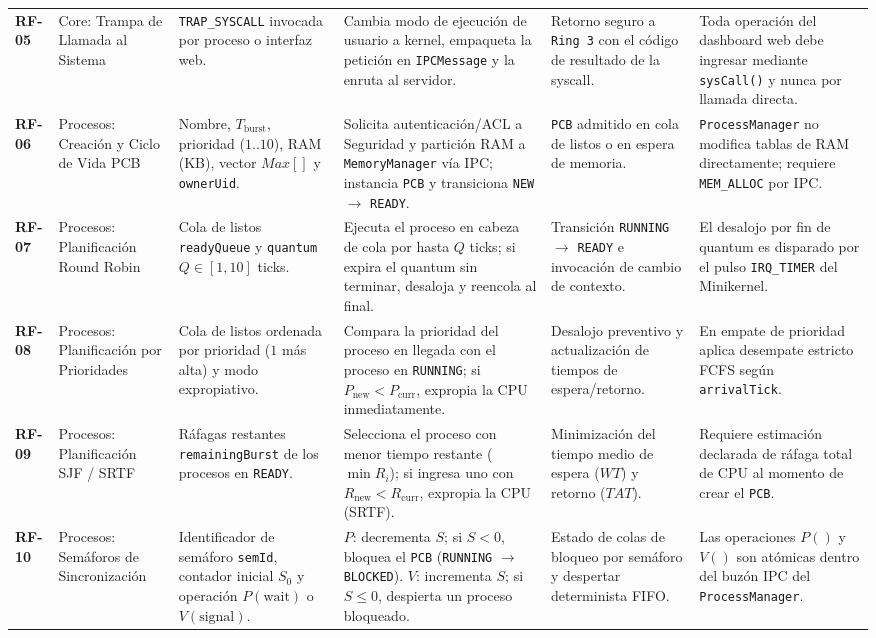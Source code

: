 \documentclass[10pt,twocolumn,letterpaper]{article}
\begin{document}
\begin{table}[!t]
\begin{tabularx}{\textwidth}{C{0.9cm} L{2.2cm} L{2.8cm} Y L{2.8cm} L{3.3cm}}
\textbf{RF-05} & Core: Trampa de Llamada al Sistema & \texttt{TRAP\_SYSCALL} invocada por proceso o interfaz web. & Cambia modo de ejecuci\'on de usuario a kernel, empaqueta la petici\'on en \texttt{IPCMessage} y la enruta al servidor. & Retorno seguro a \texttt{Ring 3} con el c\'odigo de resultado de la syscall. & Toda operaci\'on del dashboard web debe ingresar mediante \texttt{sysCall()} y nunca por llamada directa. \\
\textbf{RF-06} & Procesos: Creaci\'on y Ciclo de Vida PCB & Nombre, $T_{\text{burst}}$, prioridad ($1..10$), RAM (KB), vector $Max[]$ y \texttt{ownerUid}. & Solicita autenticaci\'on/ACL a Seguridad y partici\'on RAM a \texttt{MemoryManager} v\'ia IPC; instancia \texttt{PCB} y transiciona \texttt{NEW} $\rightarrow$ \texttt{READY}. & \texttt{PCB} admitido en cola de listos o en espera de memoria. & \texttt{ProcessManager} no modifica tablas de RAM directamente; requiere \texttt{MEM\_ALLOC} por IPC. \\
\textbf{RF-07} & Procesos: Planificaci\'on Round Robin & Cola de listos \texttt{readyQueue} y \texttt{quantum} $Q \in [1,10]$ ticks. & Ejecuta el proceso en cabeza de cola por hasta $Q$ ticks; si expira el quantum sin terminar, desaloja y reencola al final. & Transici\'on \texttt{RUNNING} $\rightarrow$ \texttt{READY} e invocaci\'on de cambio de contexto. & El desalojo por fin de quantum es disparado por el pulso \texttt{IRQ\_TIMER} del Minikernel. \\
\textbf{RF-08} & Procesos: Planificaci\'on por Prioridades & Cola de listos ordenada por prioridad ($1$ m\'as alta) y modo expropiativo. & Compara la prioridad del proceso en llegada con el proceso en \texttt{RUNNING}; si $P_{\text{new}} < P_{\text{curr}}$, expropia la CPU inmediatamente. & Desalojo preventivo y actualizaci\'on de tiempos de espera/retorno. & En empate de prioridad aplica desempate estricto FCFS seg\'un \texttt{arrivalTick}. \\
\textbf{RF-09} & Procesos: Planificaci\'on SJF / SRTF & R\'afagas restantes \texttt{remainingBurst} de los procesos en \texttt{READY}. & Selecciona el proceso con menor tiempo restante ($\min R_i$); si ingresa uno con $R_{\text{new}} < R_{\text{curr}}$, expropia la CPU (SRTF). & Minimizaci\'on del tiempo medio de espera ($WT$) y retorno ($TAT$). & Requiere estimaci\'on declarada de r\'afaga total de CPU al momento de crear el \texttt{PCB}. \\
\textbf{RF-10} & Procesos: Sem\'aforos de Sincronizaci\'on & Identificador de sem\'aforo \texttt{semId}, contador inicial $S_0$ y operaci\'on $P(\text{wait})$ o $V(\text{signal})$. & $P$: decrementa $S$; si $S < 0$, bloquea el \texttt{PCB} (\texttt{RUNNING} $\rightarrow$ \texttt{BLOCKED}). $V$: incrementa $S$; si $S \le 0$, despierta un proceso bloqueado. & Estado de colas de bloqueo por sem\'aforo y despertar determinista FIFO. & Las operaciones $P()$ y $V()$ son at\'omicas dentro del buz\'on IPC del \texttt{ProcessManager}. \\

\end{tabularx}
\end{table}
\end{document}
